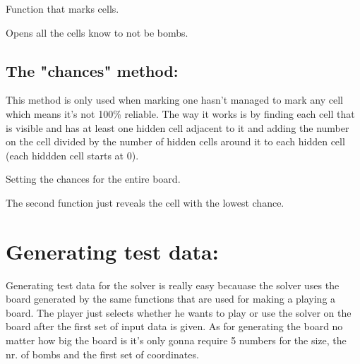 \documentclass{report}
\begin{document}
\begin{algorithm}[H]
    \caption{Function that marks cells.}
\end{algorithm}

\begin{algorithm}
    \caption{Opens all the cells know to not be bombs.}
\end{algorithm}

\subsection*{The "chances" method:}
This method is only used when marking one hasn't managed to mark any cell which means it's not 100\% reliable. The way it works is by finding each
cell that is visible and has at least one hidden cell adjacent to it and adding the number on the cell divided by the number of hidden cells around
it to each hidden cell (each hiddden cell starts at 0).

\begin{algorithm}
    \caption{Setting the chances for the entire board.}
\end{algorithm}

The second function just reveals the cell with the lowest chance.

\section*{Generating test data:}
Generating test data for the solver is really easy becauase the solver uses the board generated by the same functions that are used
for making a playing a board. The player just selects whether he wants to play or use the solver on the board after the first set of input
data is given. As for generating the board no matter how big the board is it's only gonna require 5 numbers for the size, the nr. of bombs
and the first set of coordinates.
\end{document}
